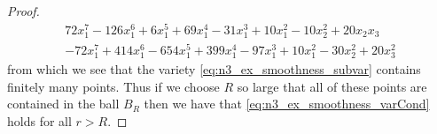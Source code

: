 \begin{proof}
\begin{align*}
    72x_1^7 - 126x_1^6 + 6x_1^5 + 69x_1^4 - 31x_1^3 + 10x_1^2 - 10x_2^2 + 20x_2x_3 \\
    -72x_1^7 + 414x_1^6 - 654x_1^5 + 399x_1^4 - 97x_1^3 + 10x_1^2 - 30x_2^2 + 20x_3^2
  \end{align*}
  from which we see that the variety \eqref{eq:n3_ex_smoothness_subvar} contains finitely many points.
  Thus if we choose $R$ so large that all of these points are contained in the ball $B_R$ then we have
  that \eqref{eq:n3_ex_smoothness_varCond} holds for all $r>R$.


\end{proof}
